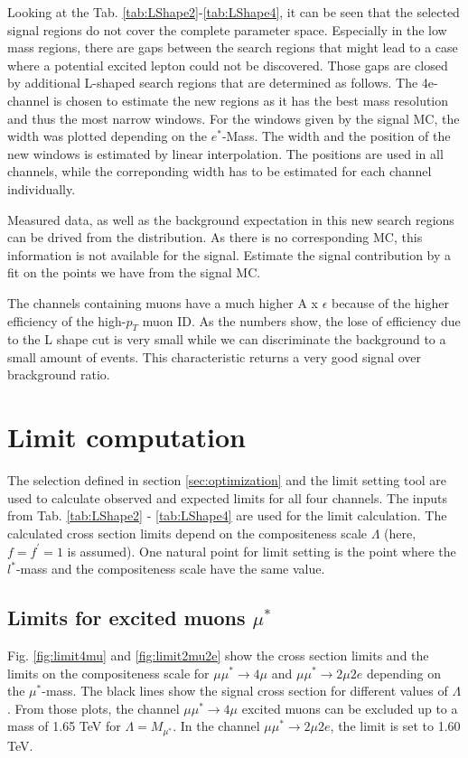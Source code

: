 Looking at the Tab. \ref{tab:LShape2}-\ref{tab:LShape4}, it can be seen that the selected signal regions do not cover the complete parameter space. Especially in the low mass regions, there are gaps between the search regions that might lead to a case where a potential excited lepton could not be discovered. Those gaps are closed by additional L-shaped search regions that are determined as follows. The 4e-channel is chosen to estimate the new regions as it has the best mass resolution and thus the most narrow windows. For the windows given by the signal MC, the width was plotted depending on the $e^*$-Mass. The width and the position of the new windows is estimated by linear interpolation. The positions are used in all channels, while the correponding width has to be estimated for each channel individually.

Measured data, as well as the background expectation in this new search regions can be drived from the distribution. As there is no corresponding MC, this information is not available for the signal. Estimate the signal contribution by a fit on the points we have from the signal MC. 

The channels containing muons have a much higher A x $\epsilon$ because of the higher efficiency of the high-$p_{T}$ muon ID. As the numbers show, the lose of efficiency due to the L shape cut is very small while we can discriminate the background to a small amount of events. This characteristic returns a very good signal over brackground ratio. 


\section{Limit computation}

The selection defined in section \ref{sec:optimization} and the limit setting tool are used to calculate observed and expected limits for all four channels. The inputs from Tab. \ref{tab:LShape2} - \ref{tab:LShape4} are used for the limit calculation. The calculated cross section limits depend on the compositeness scale $\Lambda$ (here, $f = f^{\prime} = 1$ is assumed). One natural point for limit setting is the point where the $l^{*}$-mass and the compositeness scale have the same value.      

\subsection{Limits for excited muons $\mu^{*}$}

Fig. \ref{fig:limit4mu} and \ref{fig:limit2mu2e} show the cross section limits and the limits on the compositeness scale for $\mu\mu^{*}\rightarrow 4\mu$ and $\mu\mu^{*} 
\rightarrow 2\mu2e$ depending on the $\mu^{*}$-mass. The black lines show the signal cross section for different values of $\Lambda$. From those plots, the channel 
$\mu\mu^{*}\rightarrow 4\mu$ excited muons can be excluded up to a mass of 1.65 TeV for $\Lambda = M_{\mu^{*}}$. In the channel  $\mu\mu^{*}\rightarrow 2\mu2e$, the limit is set to 1.60 TeV. 

